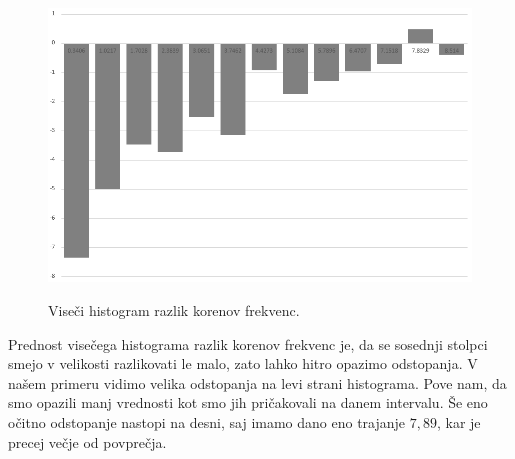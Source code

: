 \documentclass{article}
\begin{document}
\begin{figure}[H]
    \centering
    \includegraphics[height=8cm]{viseci-rootogram-3.png}
    \caption{Viseči histogram razlik korenov frekvenc.}
\end{figure}
Prednost visečega histograma razlik korenov frekvenc je, da se sosednji stolpci smejo v velikosti razlikovati
le malo, zato lahko hitro opazimo odstopanja. V našem primeru vidimo velika odstopanja na levi strani histograma.
Pove nam, da 
smo opazili manj vrednosti kot smo jih pričakovali na danem intervalu. Še eno očitno odstopanje nastopi 
na desni, saj imamo dano eno trajanje $7{,}89$, kar je precej večje od povprečja.
\end{document}
